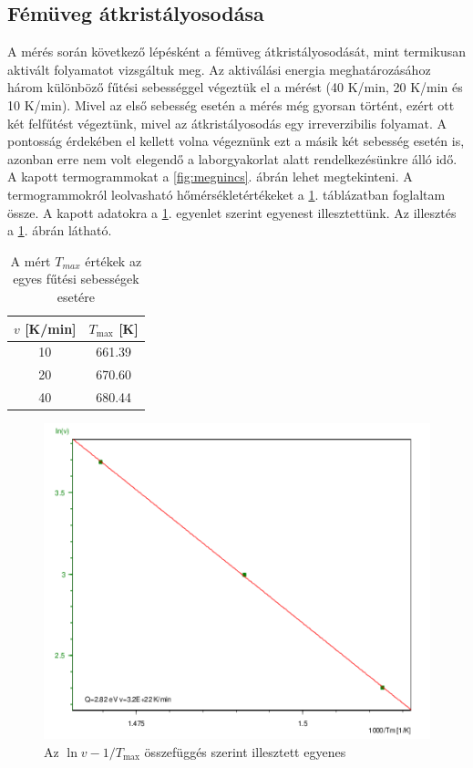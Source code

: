 \documentclass[12pt,a4paper]{article}
\begin{document}
\subsection{Fémüveg átkristályosodása}
\hspace*{10pt} A mérés során következő lépésként a fémüveg átkristályosodását, mint termikusan aktivált folyamatot vizsgáltuk meg. Az aktiválási energia meghatározásához három különböző fűtési sebességgel végeztük el a mérést (40 K/min, 20 K/min és 10 K/min). Mivel az első sebesség esetén a mérés még gyorsan történt, ezért ott két felfűtést végeztünk, mivel az átkristályosodás egy irreverzibilis folyamat. A pontosság érdekében el kellett volna végeznünk ezt a másik két sebesség esetén is, azonban erre nem volt elegendő a laborgyakorlat alatt rendelkezésünkre álló idő. A kapott termogrammokat a \ref{fig:megnincs}. ábrán lehet megtekinteni. A termogrammokról leolvasható hőmérsékletértékeket a \ref{tab:üveg}. táblázatban foglaltam össze. A kapott adatokra a \ref{egyenes}. egyenlet szerint egyenest illesztettünk. Az illesztés a \ref{egyenes}. ábrán látható.
\begin{table}[!h]
\begin{center}
\begin{tabular}{|c|c|}
\hline
$v$ [K/min] & $T_{\textrm{max}}$ [K] \\
\hline
\hline
10 & 661.39 \\
\hline
20 & 670.60 \\
\hline
40 & 680.44 \\
\hline
\end{tabular}
\caption{A mért $T_{max}$ értékek az egyes fűtési sebességek esetére}
\label{tab:üveg}
\end{center}
\end{table}

\begin{figure}[!h]
\centering
\includegraphics[width=0.8\linewidth]{12fin}
\caption{Az $\ln v - 1/T_{\textrm{max}}$ összefüggés szerint illesztett egyenes}
\label{egyenes}
\end{figure}
\end{document}
